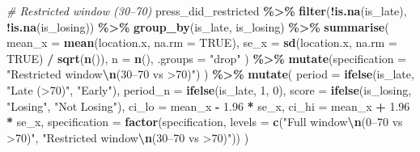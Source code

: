 \documentclass[
]{article}
\newenvironment{Shaded}{\begin{snugshade}}{\end{snugshade}}
\newcommand{\AttributeTok}[1]{\textcolor[rgb]{0.13,0.29,0.53}{#1}}
\newcommand{\CommentTok}[1]{\textcolor[rgb]{0.56,0.35,0.01}{\textit{#1}}}
\newcommand{\ConstantTok}[1]{\textcolor[rgb]{0.56,0.35,0.01}{#1}}
\newcommand{\DecValTok}[1]{\textcolor[rgb]{0.00,0.00,0.81}{#1}}
\newcommand{\FloatTok}[1]{\textcolor[rgb]{0.00,0.00,0.81}{#1}}
\newcommand{\FunctionTok}[1]{\textcolor[rgb]{0.13,0.29,0.53}{\textbf{#1}}}
\newcommand{\NormalTok}[1]{#1}
\newcommand{\SpecialCharTok}[1]{\textcolor[rgb]{0.81,0.36,0.00}{\textbf{#1}}}
\newcommand{\StringTok}[1]{\textcolor[rgb]{0.31,0.60,0.02}{#1}}
\begin{document}
\begin{Shaded}
\begin{Highlighting}[]
  \CommentTok{\# Restricted window (30–70\textquotesingle{})}
\NormalTok{  press\_did\_restricted }\SpecialCharTok{\%\textgreater{}\%}
    \FunctionTok{filter}\NormalTok{(}\SpecialCharTok{!}\FunctionTok{is.na}\NormalTok{(is\_late), }\SpecialCharTok{!}\FunctionTok{is.na}\NormalTok{(is\_losing)) }\SpecialCharTok{\%\textgreater{}\%}
    \FunctionTok{group\_by}\NormalTok{(is\_late, is\_losing) }\SpecialCharTok{\%\textgreater{}\%}
    \FunctionTok{summarise}\NormalTok{(}
      \AttributeTok{mean\_x =} \FunctionTok{mean}\NormalTok{(location.x, }\AttributeTok{na.rm =} \ConstantTok{TRUE}\NormalTok{),}
      \AttributeTok{se\_x   =} \FunctionTok{sd}\NormalTok{(location.x,   }\AttributeTok{na.rm =} \ConstantTok{TRUE}\NormalTok{) }\SpecialCharTok{/} \FunctionTok{sqrt}\NormalTok{(}\FunctionTok{n}\NormalTok{()),}
      \AttributeTok{n      =} \FunctionTok{n}\NormalTok{(), }\AttributeTok{.groups =} \StringTok{"drop"}
\NormalTok{    ) }\SpecialCharTok{\%\textgreater{}\%}
    \FunctionTok{mutate}\NormalTok{(}\AttributeTok{specification =} \StringTok{"Restricted window}\SpecialCharTok{\textbackslash{}n}\StringTok{(30–70\textquotesingle{} vs \textgreater{}70\textquotesingle{})"}\NormalTok{)}
\NormalTok{) }\SpecialCharTok{\%\textgreater{}\%}
  \FunctionTok{mutate}\NormalTok{(}
    \AttributeTok{period   =} \FunctionTok{ifelse}\NormalTok{(is\_late,   }\StringTok{"Late (\textgreater{}70\textquotesingle{})"}\NormalTok{, }\StringTok{"Early"}\NormalTok{),}
    \AttributeTok{period\_n =} \FunctionTok{ifelse}\NormalTok{(is\_late, }\DecValTok{1}\NormalTok{, }\DecValTok{0}\NormalTok{),}
    \AttributeTok{score    =} \FunctionTok{ifelse}\NormalTok{(is\_losing, }\StringTok{"Losing"}\NormalTok{, }\StringTok{"Not Losing"}\NormalTok{),}
    \AttributeTok{ci\_lo    =}\NormalTok{ mean\_x }\SpecialCharTok{{-}} \FloatTok{1.96} \SpecialCharTok{*}\NormalTok{ se\_x,}
    \AttributeTok{ci\_hi    =}\NormalTok{ mean\_x }\SpecialCharTok{+} \FloatTok{1.96} \SpecialCharTok{*}\NormalTok{ se\_x,}
    \AttributeTok{specification =} \FunctionTok{factor}\NormalTok{(specification,}
                           \AttributeTok{levels =} \FunctionTok{c}\NormalTok{(}\StringTok{"Full window}\SpecialCharTok{\textbackslash{}n}\StringTok{(0–70\textquotesingle{} vs \textgreater{}70\textquotesingle{})"}\NormalTok{,}
                                      \StringTok{"Restricted window}\SpecialCharTok{\textbackslash{}n}\StringTok{(30–70\textquotesingle{} vs \textgreater{}70\textquotesingle{})"}\NormalTok{))}
\NormalTok{  )}


\end{Highlighting}
\end{Shaded}
\end{document}
